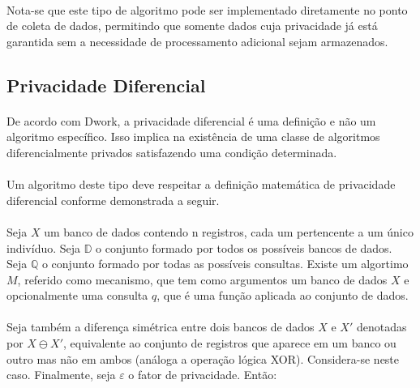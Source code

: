 \paragraph{} Nota-se que este tipo de algoritmo pode ser implementado diretamente no ponto de coleta de dados, permitindo que somente dados cuja privacidade já está garantida sem a necessidade de processamento adicional sejam armazenados.

\subsection{Privacidade Diferencial}

\paragraph{} De acordo com Dwork\cite{dwork2008differential}, a privacidade diferencial é uma definição e não um algoritmo específico. Isso implica na existência de uma classe de algoritmos diferencialmente privados satisfazendo uma condição determinada.

\paragraph{} Um algoritmo deste tipo deve respeitar a definição matemática de privacidade diferencial\cite{dwork2011differential} conforme demonstrada a seguir.

\paragraph{} Seja $X$ um banco de dados contendo n registros, cada um pertencente a um único indivíduo. 
Seja $\mathbb{D}$ o conjunto formado por todos os possíveis bancos de dados. 
Seja $\mathbb{Q}$ o conjunto formado por todas as possíveis consultas. Existe um algortimo $M$, referido como mecanismo, que tem como argumentos um banco de dados $X$ e opcionalmente uma consulta $q$, que é uma função aplicada ao conjunto de dados.

\paragraph{} Seja também a diferença simétrica entre dois bancos de dados $X$ e $X'$ denotadas por $X \ominus X'$, equivalente ao conjunto de registros que aparece em um banco ou outro mas não em ambos (análoga a operação lógica XOR). Considera-se neste caso. Finalmente, seja $\varepsilon$ o fator de privacidade. Então:

